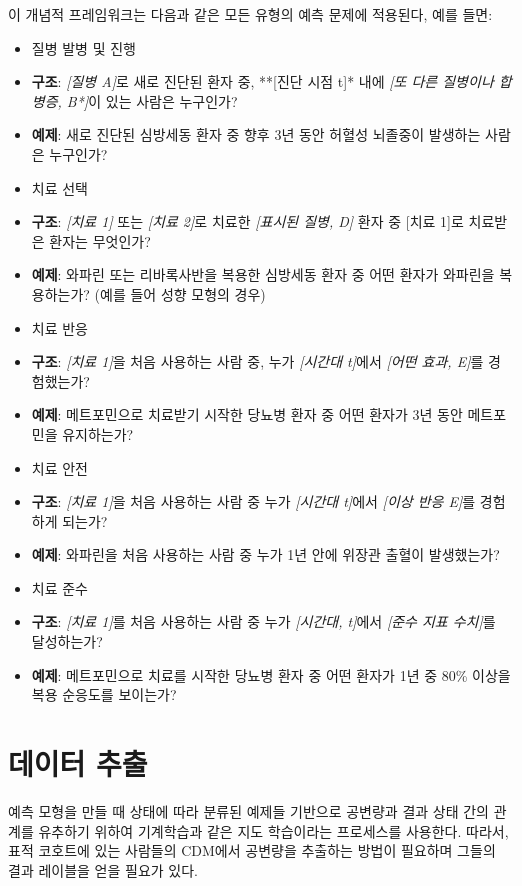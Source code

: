 \documentclass[11pt]{book}
\providecommand{\tightlist}{%
  \setlength{\itemsep}{0pt}\setlength{\parskip}{0pt}}
\theoremstyle{definition}
\theoremstyle{definition}
\theoremstyle{definition}
\theoremstyle{remark}
\begin{document}
이 개념적 프레임워크는 다음과 같은 모든 유형의 예측 문제에 적용된다,
예를 들면:

\begin{itemize}
\tightlist
\item
  질병 발병 및 진행
\item
  \textbf{구조}: \emph{{[}질병 A{]}}로 새로 진단된 환자 중, **{[}진단
  시점 t{]}* 내에 \emph{{[}또 다른 질병이나 합병증, B*{]}}이 있는 사람은
  누구인가?
\item
  \textbf{예제}: 새로 진단된 심방세동 환자 중 향후 3년 동안 허혈성
  뇌졸중이 발생하는 사람은 누구인가?
\item
  치료 선택
\item
  \textbf{구조}: \emph{{[}치료 1{]}} 또는 \emph{{[}치료 2{]}}로 치료한
  \emph{{[}표시된 질병, D{]}} 환자 중 {[}치료 1{]}로 치료받은 환자는
  무엇인가?
\item
  \textbf{예제}: 와파린 또는 리바록사반을 복용한 심방세동 환자 중 어떤
  환자가 와파린을 복용하는가? (예를 들어 성향 모형의 경우)
\item
  치료 반응
\item
  \textbf{구조}: \emph{{[}치료 1{]}}을 처음 사용하는 사람 중, 누가
  \emph{{[}시간대 t{]}}에서 \emph{{[}어떤 효과, E{]}}를 경험했는가?
\item
  \textbf{예제}: 메트포민으로 치료받기 시작한 당뇨병 환자 중 어떤 환자가
  3년 동안 메트포민을 유지하는가?
\item
  치료 안전
\item
  \textbf{구조}: \emph{{[}치료 1{]}}을 처음 사용하는 사람 중 누가
  \emph{{[}시간대 t{]}}에서 \emph{{[}이상 반응 E{]}}를 경험하게 되는가?
\item
  \textbf{예제}: 와파린을 처음 사용하는 사람 중 누가 1년 안에 위장관
  출혈이 발생했는가?
\item
  치료 준수
\item
  \textbf{구조}: \emph{{[}치료 1{]}}를 처음 사용하는 사람 중 누가
  \emph{{[}시간대, t{]}}에서 \emph{{[}준수 지표 수치{]}}를 달성하는가?
\item
  \textbf{예제}: 메트포민으로 치료를 시작한 당뇨병 환자 중 어떤 환자가
  1년 중 80\% 이상을 복용 순응도를 보이는가?
\end{itemize}

\section{데이터 추출}\label{-}

예측 모형을 만들 때 상태에 따라 분류된 예제들 기반으로 공변량과 결과
상태 간의 관계를 유추하기 위하여 기계학습과 같은 지도 학습이라는
프로세스를 사용한다.  따라서, 표적 코호트에
있는 사람들의 CDM에서 공변량을 추출하는 방법이 필요하며 그들의 결과
레이블을 얻을 필요가 있다.
\end{document}
